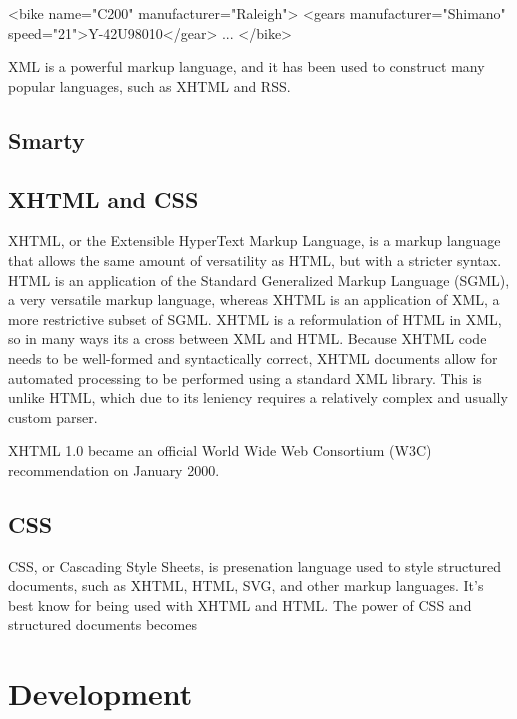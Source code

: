 \documentclass[a4paper,12pt]{report}
\begin{document}
\begin{description}
<bike name="C200" manufacturer="Raleigh">
	<gears manufacturer="Shimano" speed="21">Y-42U98010</gear>
	...
</bike>

XML is a powerful markup language, and it has been used to construct many popular languages, such as XHTML and RSS.


\section{Smarty}


\section{XHTML and CSS}
XHTML, or the Extensible HyperText Markup Language, is a markup language that allows the same amount of versatility as HTML, but with a stricter syntax. 
HTML is an application of the Standard Generalized Markup Language (SGML), a very versatile markup language, whereas XHTML is an application of XML, a more restrictive subset of SGML. 
XHTML is a reformulation of HTML in XML, so in many ways its a cross between XML and HTML. 
Because XHTML code needs to be well-formed and syntactically correct, XHTML documents allow for automated processing to be performed using a standard XML library. 
This is unlike HTML, which due to its leniency requires a relatively complex and usually custom parser. 

XHTML 1.0 became an official World Wide Web Consortium (W3C) recommendation on January 2000. 

\section {CSS}
CSS, or Cascading Style Sheets, is presenation language used to style structured documents, such as XHTML, HTML, SVG, and other markup languages. 
It's best know for being used with XHTML and HTML. 
The power of CSS and structured documents becomes 


\chapter{Development}


\end{description}
\end{document}
